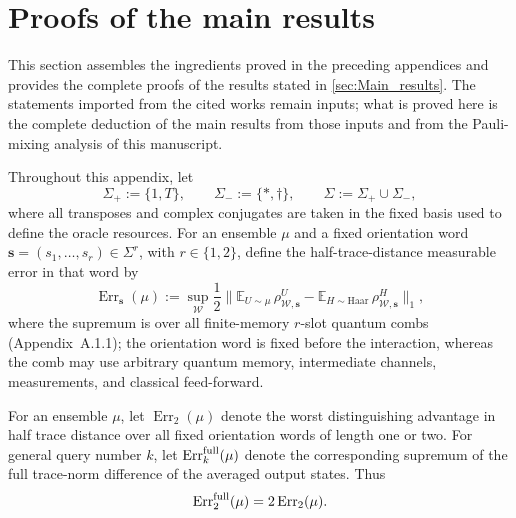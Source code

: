 \documentclass[
    aps,
    superscriptaddress,
    onecolumn,
    10pt,
    prx,
    nofootinbib
]{revtex4-2}
\theoremstyle{namedstatement}
\theoremstyle{plain}
\begin{document}
\newpage
\section{Proofs of the main results}
\label{app:main-results-proofs}

This section assembles the ingredients proved in the preceding appendices and
provides the complete proofs of the results stated in
\cref{sec:Main_results}. The statements imported from the cited works remain
inputs; what is proved here is the complete deduction of the main results from
those inputs and from the Pauli-mixing analysis of this manuscript.



Throughout this appendix, let
\begin{equation}
\Sigma_+ := \{1, T\}, \qquad \Sigma_- := \{*, \dagger\}, \qquad \Sigma := \Sigma_+ \cup \Sigma_-,
\label{eq:sigma}
\end{equation}
where all transposes and complex conjugates are taken in the fixed basis used to define the oracle resources. For an ensemble $\mu$ and a fixed orientation word $\boldsymbol{s} = (s_1, \dots, s_r) \in \Sigma^r$, with $r \in \{1,2\}$, define the half-trace-distance measurable error in that word by
\begin{equation}
\operatorname{Err}_{\boldsymbol{s}}(\mu) := \sup_{\mathcal{W}} \frac{1}{2} \bigl\| \mathbb{E}_{U \sim \mu}\, \rho^{U}_{\mathcal{W},\boldsymbol{s}} - \mathbb{E}_{H \sim \mathrm{Haar}}\, \rho^{H}_{\mathcal{W},\boldsymbol{s}} \bigr\|_1,
\label{eq:err-word}
\end{equation}
where the supremum is over all finite-memory $r$-slot quantum combs (Appendix~A.1.1); the orientation word is fixed before the interaction, whereas the comb may use arbitrary quantum memory, intermediate channels, measurements, and classical feed-forward.


For an ensemble $\mu$, let $\operatorname{Err}_{2}(\mu)$ denote the worst
distinguishing advantage in half trace distance over all fixed orientation
words of length one or two. For general query number $k$, let
$\operatorname{Err}_{k}^{\rm full}(\mu)$ denote the corresponding supremum
of the full trace-norm difference of the averaged output states. Thus
\begin{equation}
    \operatorname{Err}_{2}^{\rm full}(\mu)
    =
    2\operatorname{Err}_{2}(\mu).
    \label{eq:appendix-error-conversion}
\end{equation}
\end{document}
